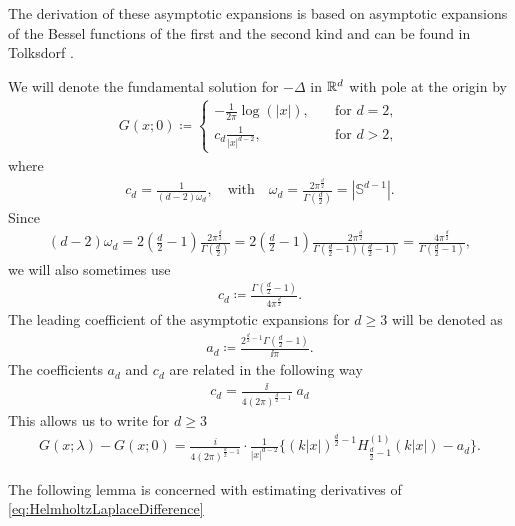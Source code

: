 The derivation of these asymptotic expansions is based on asymptotic expansions of the Bessel functions of the first and the second kind and can be found in Tolksdorf \cite{tolksdorfDiss}.

We will denote the fundamental solution for $-\Delta$ in $\mathbb{R}^d$ with pole at the origin by
\begin{align*}
  G(x;0) \coloneqq \begin{cases} -\frac{1}{2\pi} \log(|x|), &\quad\text{for } d = 2, \\c_d \frac{1}{|x|^{d - 2}}, &\quad\text{for } d > 2,  \end{cases}
\end{align*}
where
\begin{align*}
  c_d = \frac{1}{(d - 2) \omega_d}, \quad\text{with}\quad \omega_d = \frac{2\pi^{\frac{d}{2}}}{\Gamma(\frac{d}{2})} = |\mathbb{S}^{d - 1}|.
\end{align*}
Since
\begin{align*}
  (d - 2) \omega_d 
  = 2 ( \frac{d}{2} - 1) \frac{2 \pi^{\frac{d}{2}}}{\Gamma(\frac{d}{2})}
  =  2 (\frac{d}{2} - 1) \frac{2 \pi^{\frac{d}{2}}}{\Gamma(\frac{d}{2} - 1)(\frac{d}{2} - 1)}
  = \frac{4 \pi^{\frac{d}{2}}}{\Gamma(\frac{d}{2} - 1)},
\end{align*}
we will also sometimes use
\begin{align*}
  c_d \coloneqq \frac{\Gamma(\frac{d}{2} - 1)}{4 \pi^{\frac{d}{2}}}.
\end{align*}
The leading coefficient of the asymptotic expansions for $d \geq 3$ will be denoted as
\begin{align}
  \label{eq:Defnad}
  a_d \coloneqq \frac{2^{\frac{d}{2} - 1} \Gamma(\frac{d}{2} - 1)}{\ii \pi}.
\end{align}
The coefficients $a_d$ and $c_d$ are related in the following way
\begin{align*}
  c_d 
  =\frac{\ii} {4 (2 \pi)^{\frac{d}{2} - 1}}\; a_d 
\end{align*}
This allows us to write for $d \geq 3$
\begin{align}
  \label{eq:HelmholtzLaplaceDifference}
  G(x;\lambda) - G(x; 0) = \frac{i}{4(2\pi)^{\frac{d}{2} - 1}} \cdot \frac{1}{|x|^{d - 2}} \Big\{ (k|x|)^{\frac{d}{2} - 1} H_{\frac{d}{2} - 1}^{(1)}(k|x|) - a_d \Big\}.
\end{align}

The following lemma is concerned with estimating derivatives of \eqref{eq:HelmholtzLaplaceDifference}

